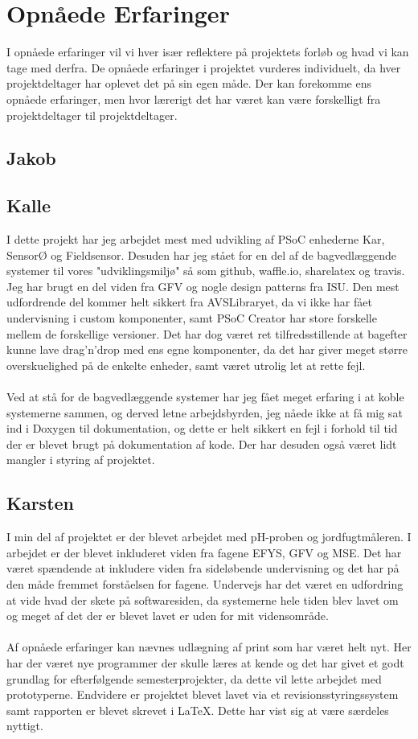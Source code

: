 \section{Opnåede Erfaringer}
I opnåede erfaringer vil vi hver især reflektere på projektets forløb og hvad vi kan tage med derfra. De opnåede erfaringer i projektet vurderes individuelt, da hver projektdeltager har oplevet det på sin egen måde. Der kan forekomme ens opnåede erfaringer, men hvor lærerigt det har været kan være forskelligt fra projektdeltager til projektdeltager.

\subsection{Jakob}

\subsection{Kalle}
I dette projekt har jeg arbejdet mest med udvikling af PSoC enhederne Kar, SensorØ og Fieldsensor. Desuden har jeg  stået for en del af de bagvedlæggende systemer til vores "udviklingsmiljø" så som github, waffle.io, sharelatex og travis. Jeg har brugt en del viden fra GFV og nogle design patterns fra ISU. Den mest udfordrende del kommer helt sikkert fra AVSLibraryet, da vi ikke har fået undervisning i custom komponenter, samt PSoC Creator har store forskelle mellem de forskellige versioner. Det har dog været ret tilfredsstillende at bagefter kunne lave drag'n'drop med ens egne komponenter, da det har giver meget større overskuelighed på de enkelte enheder, samt været utrolig let at rette fejl.\\\\
Ved at stå for de bagvedlæggende systemer har jeg fået meget erfaring i at koble systemerne sammen, og derved letne arbejdsbyrden, jeg nåede ikke at få mig sat ind i Doxygen til dokumentation, og dette er helt sikkert en fejl i forhold til tid der er blevet brugt på dokumentation af kode. Der har desuden også været lidt mangler i styring af projektet. 

\subsection{Karsten}
I min del af projektet er der blevet arbejdet med pH-proben og jordfugtmåleren. I arbejdet er der blevet inkluderet viden fra fagene EFYS, GFV og MSE. Det har været spændende at inkludere viden fra sideløbende undervisning og det har på den måde fremmet forståelsen for fagene. Undervejs har det været en udfordring at vide hvad der skete på softwaresiden, da systemerne hele tiden blev lavet om og meget af det der er blevet lavet er uden for mit vidensområde.
\\\\
Af opnåede erfaringer kan nævnes udlægning af print som har været helt nyt. Her har der været nye programmer der skulle læres at kende og det har givet et godt grundlag for efterfølgende semesterprojekter, da dette vil lette arbejdet med prototyperne. Endvidere er projektet blevet lavet via et revisionsstyringssystem samt rapporten er blevet skrevet i LaTeX. Dette har vist sig at være særdeles nyttigt. 
